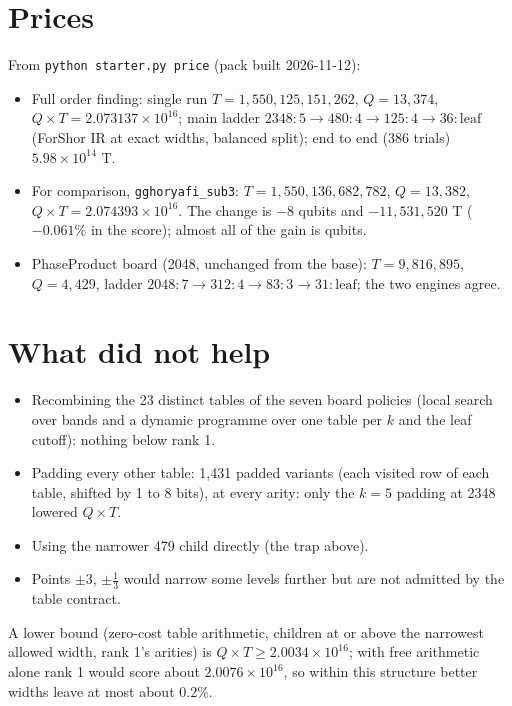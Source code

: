 \documentclass[11pt]{article}
\begin{document}
\section*{Prices}
From \texttt{python starter.py price} (pack built 2026-11-12):
\begin{itemize}
  \item Full order finding: single run $T = 1{,}550{,}125{,}151{,}262$, $Q = 13{,}374$,
        $Q \times T = 2.073137 \times 10^{16}$; main ladder $2348{:}5 \to 480{:}4 \to 125{:}4 \to 36{:}\text{leaf}$
        (ForShor IR at exact widths, balanced split); end to end (386 trials) $5.98 \times 10^{14}$ T.
  \item For comparison, \texttt{gghoryafi\_sub3}: $T = 1{,}550{,}136{,}682{,}782$, $Q = 13{,}382$,
        $Q \times T = 2.074393 \times 10^{16}$. The change is $-8$ qubits and $-11{,}531{,}520$ T ($-0.061\%$ in the score);
        almost all of the gain is qubits.
  \item PhaseProduct board (2048, unchanged from the base): $T = 9{,}816{,}895$, $Q = 4{,}429$, ladder
        $2048{:}7 \to 312{:}4 \to 83{:}3 \to 31{:}\text{leaf}$; the two engines agree.
\end{itemize}

\section*{What did not help}
\begin{itemize}
  \item Recombining the 23 distinct tables of the seven board policies (local search over bands and a dynamic
        programme over one table per $k$ and the leaf cutoff): nothing below rank 1.
  \item Padding every other table: 1{,}431 padded variants (each visited row of each table, shifted by 1 to 8 bits),
        at every arity: only the $k=5$ padding at 2348 lowered $Q \times T$.
  \item Using the narrower 479 child directly (the trap above).
  \item Points $\pm 3$, $\pm\tfrac13$ would narrow some levels further but are not admitted by the table contract.
\end{itemize}
A lower bound (zero-cost table arithmetic, children at or above the narrowest allowed width, rank 1's arities) is
$Q \times T \ge 2.0034 \times 10^{16}$; with free arithmetic alone rank 1 would score about $2.0076 \times 10^{16}$,
so within this structure better widths leave at most about $0.2\%$.
\end{document}
